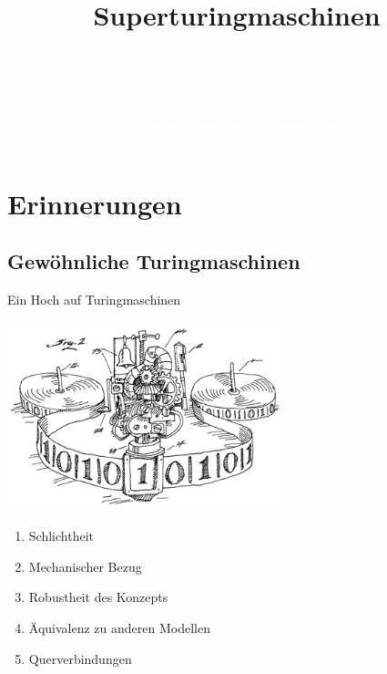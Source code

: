 \documentclass[12pt,compress,ngerman,utf8,t]{beamer}
\title[Superturingmaschinen]{Superturingmaschinen}
\author[Ingo Blechschmidt]{\textcolor{white}{Ingo Blechschmidt}}
\date[2016-10-04]{\vspace*{-4em}\ \\\textcolor{white}{\scriptsize Curry Club Augsburg \\ 4. Oktober 2016 und 3. November 2016}}
\begin{document}
{
\frame{\vspace*{12em}\titlepage}}
\frame{\tableofcontents}

\section{Erinnerungen}

\subsection{Gewöhnliche Turingmaschinen}

\begin{frame}{Ein Hoch auf Turingmaschinen}
  \begin{center}
    \includegraphics[width=0.6\textwidth]{images/turing-machine}
  \end{center}

  \begin{multicols}{2}
    \begin{enumerate}
      \item Schlichtheit
      \item Mechanischer Bezug
      \item Robustheit des Konzepts
      \item Äquivalenz zu anderen Modellen
      \item Querverbindungen
    \end{enumerate}
  \end{multicols}
\end{frame}
\end{document}
